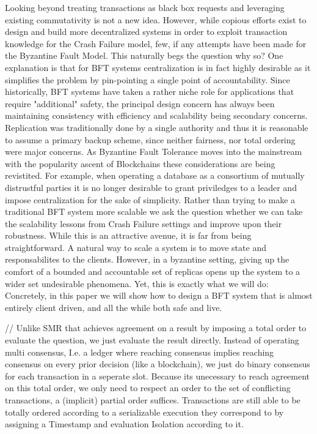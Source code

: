 Looking beyond treating transactions as black box requests and leveraging existing commutativity is not a new idea. However, while copious efforts exist to design and build more decentralized systems in order to exploit transaction knowledge for the Crash Failure model, few, if any attempts have been made for the Byzantine Fault Model. This naturally begs the question why so? One explanation is that for BFT systems centralization is in fact highly desirable as it simplifies the problem by pin-pointing a single point of accountability. Since historically, BFT systems have taken a rather niche role for applications that require "additional" safety, the principal design concern has always been maintaining consistency with efficiency and scalability being secondary concerns. Replication was traditionally done by a single authority and thus it is reasonable to assume a primary backup scheme, since neither fairness, nor total ordering were major concerns. As Byzantine Fault Tolerance moves into the mainstream with the popularity ascent of Blockchains these considerations are being revistited. For example, when operating a database as a consortium of mutually distrustful parties it is no longer desirable to grant priviledges to a leader and impose centralization for the sake of simplicity.
Rather than trying to make a traditional BFT system more scalable we ask the question whether we can take the scalability lessons from Crash Failure settings and improve upon their robustness. While this is an attractive avenue, it is far from being straightforward. A natural way to scale a system is to move state and responsabilites to the clients.  
However, in a byzantine setting, giving up the comfort of a bounded and accountable set of replicas opens up the system to a wider set undesirable phenomena. Yet, this is exactly what we will do: Concretely, in this paper we will show how to design a BFT system that is almost entirely client driven, and all the while both safe and live. 


// Unlike SMR that achieves agreement on a result by imposing a total order to evaluate the question, we just evaluate the result directly. Instead of operating multi consensus, I.e. a ledger where reaching consensus implies reaching consensus on every prior decision (like a blockchain), we just do binary consensus for each transaction in a seperate slot. Because its unecessary to reach agreement on this total order, we only need to respect an order to the set of conflicting transactions, a (implicit) partial order suffices.
 Transactions are still able to be totally ordered according to a serializable execution they correspond to by assigning a Timestamp and evaluation Isolation according to it.

